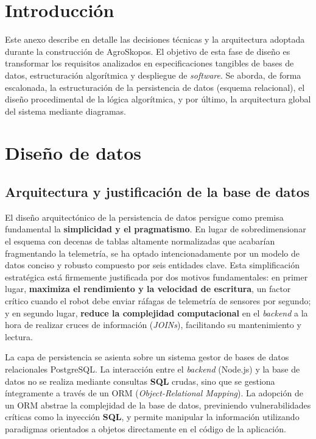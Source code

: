 
\section{Introducción}
Este anexo describe en detalle las decisiones técnicas y la arquitectura adoptada durante la construcción de AgroSkopos. El objetivo de esta fase de diseño es transformar los requisitos analizados en especificaciones tangibles de bases de datos, estructuración algorítmica y despliegue de \textit{software}. Se aborda, de forma escalonada, la estructuración de la persistencia de datos (esquema relacional), el diseño procedimental de la lógica algorítmica, y por último, la arquitectura global del sistema mediante diagramas.

\section{Diseño de datos}

\subsection{Arquitectura y justificación de la base de datos}
El diseño arquitectónico de la persistencia de datos persigue como premisa fundamental la \textbf{simplicidad y el pragmatismo}. En lugar de sobredimensionar el esquema con decenas de tablas altamente normalizadas que acabarían fragmentando la telemetría, se ha optado intencionadamente por un modelo de datos conciso y robusto compuesto por seis entidades clave. Esta simplificación estratégica está firmemente justificada por dos motivos fundamentales: en primer lugar, \textbf{maximiza el rendimiento y la velocidad de escritura}, un factor crítico cuando el robot debe enviar ráfagas de telemetría de sensores por segundo; y en segundo lugar, \textbf{reduce la complejidad computacional} en el \textit{backend} a la hora de realizar cruces de información (\textit{JOINs}), facilitando su mantenimiento y lectura.

La capa de persistencia se asienta sobre un sistema gestor de bases de datos relacionales PostgreSQL. La interacción entre el \textit{backend} (Node.js) y la base de datos no se realiza mediante consultas \textbf{SQL} crudas, sino que se gestiona íntegramente a través de un ORM (\textit{Object-Relational Mapping}). La adopción de un ORM abstrae la complejidad de la base de datos, previniendo vulnerabilidades críticas como la inyección \textbf{SQL}, y permite manipular la información utilizando paradigmas orientados a objetos directamente en el código de la aplicación.

